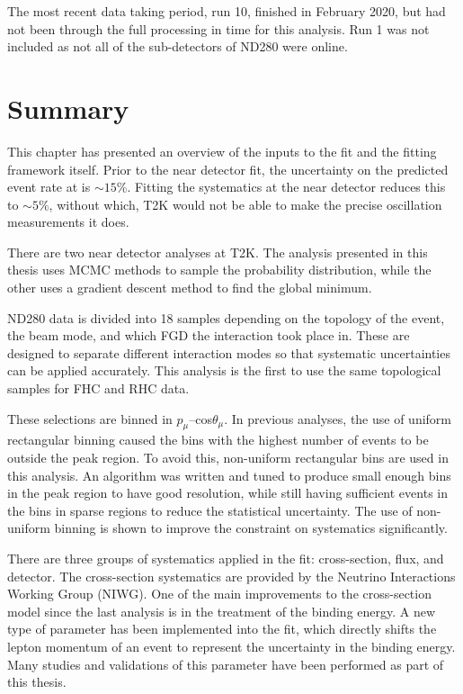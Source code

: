 The most recent data taking period, run 10, finished in February 2020, but had not been through the full processing in time for this analysis. Run 1 was not included as not all of the sub-detectors of ND280 were online.

\section{Summary}

This chapter has presented an overview of the inputs to the fit and the fitting framework itself. Prior to the near detector fit, the uncertainty on the predicted event rate at \SK is $\sim15\%$. Fitting the systematics at the near detector reduces this to $\sim5\%$, without which, T2K would not be able to make the precise oscillation measurements it does.

There are two near detector analyses at T2K. The analysis presented in this thesis uses MCMC methods to sample the probability distribution, while the other uses a gradient descent method to find the global minimum.

ND280 data is divided into 18 samples depending on the topology of the event, the beam mode, and which FGD the interaction took place in. These are designed to separate different interaction modes so that systematic uncertainties can be applied accurately. This analysis is the first to use the same topological samples for FHC and RHC data.

These selections are binned in $p_{\mu}$--cos$\theta_{\mu}$. In previous analyses, the use of uniform rectangular binning caused the bins with the highest number of events to be outside the peak region. To avoid this, non-uniform rectangular bins are used in this analysis. An algorithm was written and tuned to produce small enough bins in the peak region to have good resolution, while still having sufficient events in the bins in sparse regions to reduce the statistical uncertainty. The use of non-uniform binning is shown to improve the constraint on systematics significantly. 

There are three groups of systematics applied in the fit: cross-section, flux, and detector. The cross-section systematics are provided by the Neutrino Interactions Working Group (NIWG). One of the main improvements to the cross-section model since the last analysis is in the treatment of the binding energy. A new type of parameter has been implemented into the fit, which directly shifts the lepton momentum of an event to represent the uncertainty in the binding energy. Many studies and validations of this parameter have been performed as part of this thesis. 

